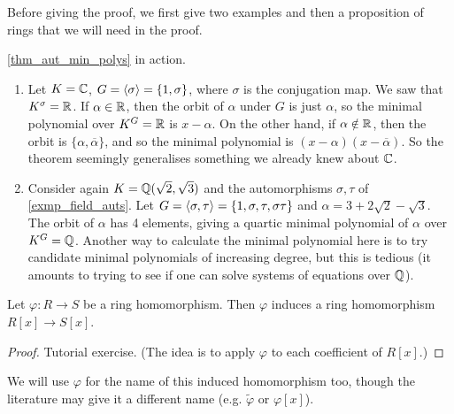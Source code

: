 Before giving the proof, we first give two examples and then a proposition of rings that we will need in the proof.

\begin{example} \cref{thm_aut_min_polys} in action.
    \hphantom{aaa}
    \begin{enumerate}
        \item Let $K = \mathbb{{C}}$, $G = \langle {\sigma} \rangle = \{1, \sigma\}$, where $\sigma$ is the conjugation map. We saw that $K^\sigma = \mathbb{{R}}$. If $\alpha \in \mathbb{{R}}$, then the orbit of $\alpha$ under $G$ is just $\alpha$, so the minimal polynomial over $K^G = \mathbb{{R}}$ is $x - \alpha$. On the other hand, if $\alpha \notin \mathbb{{R}}$, then the orbit is $\{\alpha, \overline{\alpha}\}$, and so the minimal polynomial is $(x - \alpha)(x - \overline{\alpha})$. So the theorem seemingly generalises something we already knew about $\mathbb{{C}}$.
        
        \item Consider again $K = \mathbb{{Q}}(\sqrt{2}, \sqrt{3})$ and the automorphisms $\sigma, \tau$ of \cref{exmp_field_auts}. Let $G = \langle {\sigma, \tau} \rangle = \{1, \sigma, \tau, \sigma \tau\}$ and $\alpha = 3 + 2\sqrt{2} - \sqrt{3}$. The orbit of $\alpha$ has 4 elements, giving a quartic minimal polynomial of $\alpha$ over $K^G = \mathbb{{Q}}$. Another way to calculate the minimal polynomial here is to try candidate minimal polynomials of increasing degree, but this is tedious (it amounts to trying to see if one can solve systems of equations over $\mathbb{{Q}}$).
    \end{enumerate}
\end{example}

\begin{proposition}
\label{prop_ring_hom_to_poly_ring_hom}
    Let $\varphi: R \to S$ be a ring homomorphism. Then $\varphi$ induces a ring homomorphism $R[x] \to S[x]$.
\end{proposition}

\begin{proof}
    Tutorial exercise. (The idea is to apply $\varphi$ to each coefficient of $R[x]$.)
\end{proof}

\begin{remark}
    We will use $\varphi$ for the name of this induced homomorphism too, though the literature may give it a different name (e.g. $\widetilde{\varphi}$ or $\varphi[x]$).
\end{remark}

